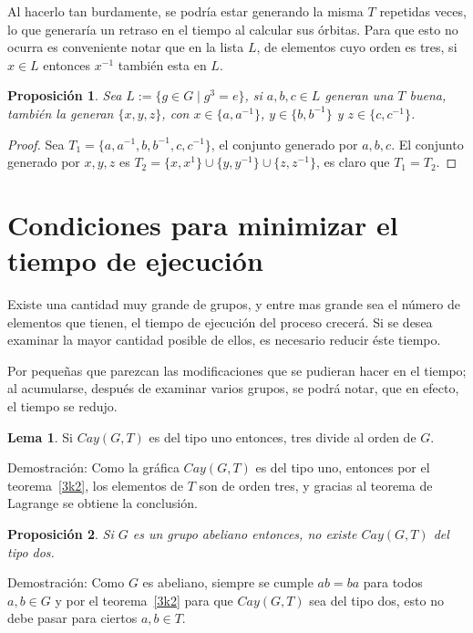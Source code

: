\documentclass[12pt]{book}
\newtheorem{proposition}{Proposición}
\theoremstyle{definition}
\newtheorem{lemma}{Lema} \newcounter{in} \newcounter{ini}
\begin{document}
Al hacerlo tan burdamente, se podría estar generando la misma $T$
repetidas veces, lo que generaría un retraso en el tiempo al calcular
sus órbitas. Para que esto no ocurra es conveniente notar que en la
lista $L$, de elementos cuyo orden es tres, si $x\in L$ entonces
$x^{-1}$ también esta en $L$.

\begin{proposition}\label{generanaT}
  Sea $L:=\{ g\in G \mid g^3=e\}$, si $a,b,c\in L$ generan una $T$
  buena, también la generan $\{x,y,z\}$, con $x\in \{a,a^{-1}\}$,
  $y\in \{b,b^{-1}\}$ y $z\in \{c,c^{-1}\}$.
\end{proposition}

\begin{proof} Sea $T_1=\{a,a^{-1},b,b^{-1},c,c^{-1}\}$, el conjunto
generado por $a,b,c$. El conjunto generado por $x,y,z$ es
$T_2=\{x,x^1\}\cup \{y,y^{-1}\}\cup \{z,z^{-1}\}$, es claro que
$T_1=T_2$.
\end{proof}
\section[Minimizar el tiempo de ejecución]%
{Condiciones para minimizar el tiempo de ejecución}

Existe una cantidad muy grande de grupos, y entre mas grande sea el
número de elementos que tienen, el tiempo de ejecución del proceso
crecerá. Si se desea examinar la mayor cantidad posible de ellos, es
necesario reducir éste tiempo.

Por pequeñas que parezcan las modificaciones que se pudieran hacer en
el tiempo; al acumularse, después de examinar varios grupos, se podrá
notar, que en efecto, el tiempo se redujo.

\begin{lemma}\label{3entreg}
  Si $Cay(G,T)$ es del tipo uno entonces, tres divide al orden de $G$.
\end{lemma}
Demostración: Como la gráfica $Cay(G,T)$ es del tipo uno, entonces por
el teorema~\ref{3k2}, los elementos de $T$ son de orden tres, y
gracias al teorema de Lagrange se obtiene la conclusión.

\begin{proposition}
  Si $G$ es un grupo abeliano entonces, no existe $Cay(G,T)$ del tipo
  dos.\label{notipo2}
\end{proposition}

Demostración: Como $G$ es abeliano, siempre se cumple $ab=ba$ para
todos $a,b\in G$ y por el teorema~\ref{3k2} para que $Cay(G,T)$ sea
del tipo dos, esto no debe pasar para ciertos $a,b \in T$.
\end{document}
